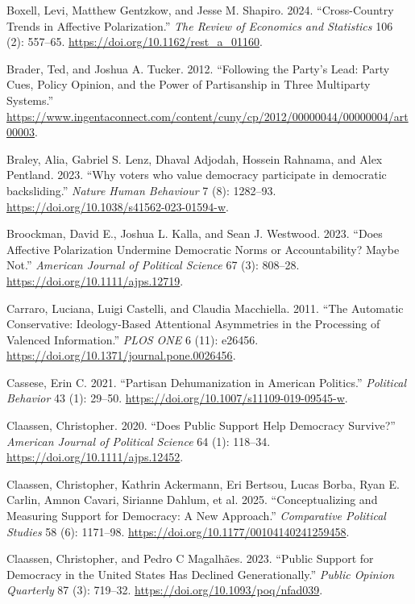 \documentclass[
  10pt,
  letterpaper,
  DIV=11,
  numbers=noendperiod]{scrartcl}
\newlength{\cslhangindent}
\newenvironment{CSLReferences}[2] %
 {\begin{list}{}{%
  \setlength{\itemindent}{0pt}
  \setlength{\leftmargin}{0pt}
  \setlength{\parsep}{0pt}
  \ifodd #1
   \setlength{\leftmargin}{\cslhangindent}
   \setlength{\itemindent}{-1\cslhangindent}
  \fi
  \setlength{\itemsep}{#2\baselineskip}}}
 {\end{list}}
\begin{document}
\begin{CSLReferences}{1}{0}
Boxell, Levi, Matthew Gentzkow, and Jesse M. Shapiro. 2024.
{``Cross-Country Trends in Affective Polarization.''} \emph{The Review
of Economics and Statistics} 106 (2): 557--65.
\url{https://doi.org/10.1162/rest_a_01160}.

Brader, Ted, and Joshua A. Tucker. 2012. {``Following the Party's Lead:
Party Cues, Policy Opinion, and the Power of Partisanship in Three
Multiparty Systems.''}
\url{https://www.ingentaconnect.com/content/cuny/cp/2012/00000044/00000004/art00003}.

Braley, Alia, Gabriel S. Lenz, Dhaval Adjodah, Hossein Rahnama, and Alex
Pentland. 2023. {``Why voters who value democracy participate in
democratic backsliding.''} \emph{Nature Human Behaviour} 7 (8):
1282--93. \url{https://doi.org/10.1038/s41562-023-01594-w}.

Broockman, David E., Joshua L. Kalla, and Sean J. Westwood. 2023.
{``Does Affective Polarization Undermine Democratic Norms or
Accountability? Maybe Not.''} \emph{American Journal of Political
Science} 67 (3): 808--28. \url{https://doi.org/10.1111/ajps.12719}.

Carraro, Luciana, Luigi Castelli, and Claudia Macchiella. 2011. {``The
Automatic Conservative: Ideology-Based Attentional Asymmetries in the
Processing of Valenced Information.''} \emph{PLOS ONE} 6 (11): e26456.
\url{https://doi.org/10.1371/journal.pone.0026456}.

Cassese, Erin C. 2021. {``Partisan Dehumanization in American
Politics.''} \emph{Political Behavior} 43 (1): 29--50.
\url{https://doi.org/10.1007/s11109-019-09545-w}.

Claassen, Christopher. 2020. {``Does Public Support Help Democracy
Survive?''} \emph{American Journal of Political Science} 64 (1):
118--34. \url{https://doi.org/10.1111/ajps.12452}.

Claassen, Christopher, Kathrin Ackermann, Eri Bertsou, Lucas Borba, Ryan
E. Carlin, Amnon Cavari, Sirianne Dahlum, et al. 2025.
{``Conceptualizing and Measuring Support for Democracy: A New
Approach.''} \emph{Comparative Political Studies} 58 (6): 1171--98.
\url{https://doi.org/10.1177/00104140241259458}.

Claassen, Christopher, and Pedro C Magalhães. 2023. {``Public Support
for Democracy in the United States Has Declined Generationally.''}
\emph{Public Opinion Quarterly} 87 (3): 719--32.
\url{https://doi.org/10.1093/poq/nfad039}.


\end{CSLReferences}
\end{document}
